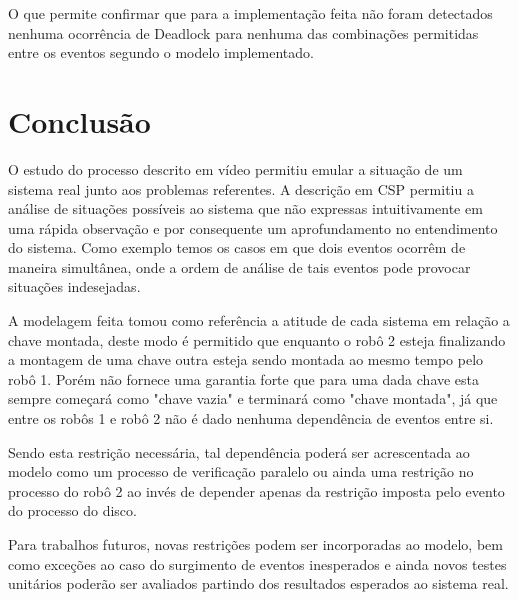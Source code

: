 \documentclass[a4paper,11pt,twocolumns]{article}
\begin{document}
O que permite confirmar que para a implementação feita não foram detectados nenhuma ocorrência de Deadlock para nenhuma das combinações permitidas entre os eventos segundo o modelo implementado.

\section{Conclusão}
O estudo do processo descrito em vídeo permitiu emular a situação de um sistema real junto aos problemas referentes. A descrição em CSP permitiu a análise de situações possíveis ao sistema que não expressas intuitivamente em uma rápida observação e por consequente um aprofundamento no entendimento do sistema. Como exemplo temos os casos em que dois eventos ocorrêm de maneira simultânea, onde a ordem de análise de tais eventos pode provocar situações indesejadas.

A modelagem feita tomou como referência a atitude de cada sistema em relação a chave montada, deste modo é permitido que enquanto o robô 2 esteja finalizando a montagem de uma chave outra esteja sendo montada ao mesmo tempo pelo robô 1. Porém não fornece uma garantia forte que para uma dada chave esta sempre começará como "chave vazia" e terminará como "chave montada", já que entre os robôs 1 e robô 2 não é dado nenhuma dependência de eventos entre si.

Sendo esta restrição necessária, tal dependência poderá ser acrescentada ao modelo como um processo de verificação paralelo ou ainda uma restrição no processo do robô 2 ao invés de depender apenas da restrição imposta pelo evento do processo do disco.

Para trabalhos futuros, novas restrições podem ser incorporadas ao modelo, bem como exceções ao caso do surgimento de eventos inesperados e ainda novos testes unitários poderão ser avaliados partindo dos resultados esperados ao sistema real.





\end{document}
